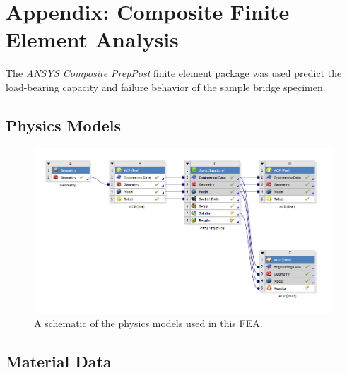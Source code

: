 \section{Appendix: Composite Finite Element Analysis}

The \textit{ANSYS Composite PrepPost} finite element package was used predict the load-bearing capacity and failure behavior of the sample bridge specimen.

\subsection{Physics Models}

\begin{figure}[htp]
\centering
\includegraphics[width=1\textwidth]{./figures/fea/fea-project-schematic}
\caption{A schematic of the physics models used in this FEA.}
\label{fig:fea-project-schematic}
\end{figure}

\clearpage

\subsection{Material Data}

